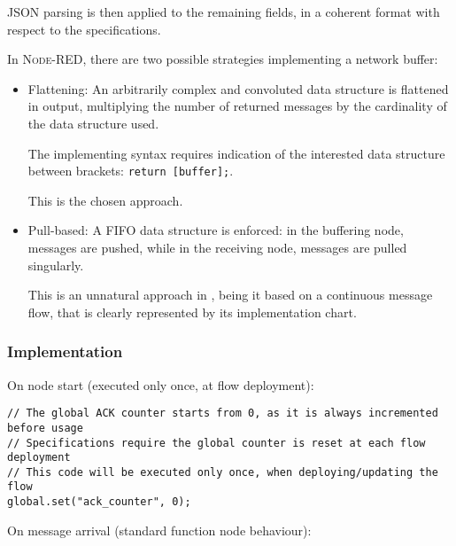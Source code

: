 \documentclass[a4paper,11pt]{article} %
\begin{document}
    \smallskip

    \textsc{JSON} parsing is then applied to the remaining fields, in a coherent format with respect to the specifications.

    \smallskip

    In \textsc{Node-RED}, there are two possible strategies implementing a network buffer:

    \begin{itemize}
        \item Flattening: An arbitrarily complex and convoluted data structure is flattened in output, multiplying the number of returned messages by the cardinality of the data structure used.

        The implementing syntax requires indication of the interested data structure between brackets: \texttt{return [buffer];}.

        This is the chosen approach.
        \item Pull-based: A FIFO data structure is enforced: in the buffering node, messages are pushed, while in the receiving node, messages are pulled singularly.

        This is an unnatural approach in , being it based on a continuous message flow, that is clearly represented by its implementation chart.
    \end{itemize}

    \subsubsection{Implementation}

    On node start (executed only once, at flow deployment):

    \begin{verbatim}
// The global ACK counter starts from 0, as it is always incremented before usage
// Specifications require the global counter is reset at each flow deployment
// This code will be executed only once, when deploying/updating the flow
global.set("ack_counter", 0);
    \end{verbatim}

    On message arrival (standard function node behaviour):
\end{document}
